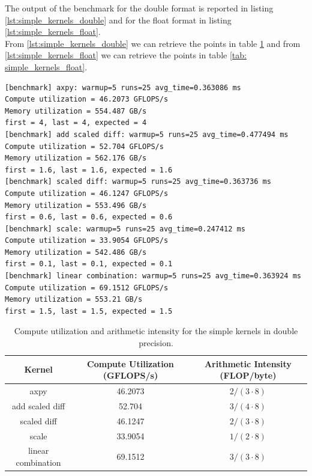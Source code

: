 \documentclass[unicode,10pt,a4paper,oneside,numbers=endperiod,openany]{scrartcl}
\begin{document}
The output of the benchmark for the double format is reported in listing \ref{lst:simple_kernels_double} and for the float format in listing \ref{lst:simple_kernels_float}.\\
From \ref{lst:simple_kernels_double} we can retrieve the points in table \ref{tab: simple_kernels_double} and from \ref{lst:simple_kernels_float} we can retrieve the points in table \ref{tab: simple_kernels_float}.



\begin{lstlisting}[style=grayverbatim,caption={Output of the simple kernels for the double format.},language=bash,label={lst:simple_kernels_double}]
[benchmark] axpy: warmup=5 runs=25 avg_time=0.363086 ms
Compute utilization = 46.2073 GFLOPS/s
Memory utilization = 554.487 GB/s
first = 4, last = 4, expected = 4
[benchmark] add scaled diff: warmup=5 runs=25 avg_time=0.477494 ms
Compute utilization = 52.704 GFLOPS/s
Memory utilization = 562.176 GB/s
first = 1.6, last = 1.6, expected = 1.6
[benchmark] scaled diff: warmup=5 runs=25 avg_time=0.363736 ms
Compute utilization = 46.1247 GFLOPS/s
Memory utilization = 553.496 GB/s
first = 0.6, last = 0.6, expected = 0.6
[benchmark] scale: warmup=5 runs=25 avg_time=0.247412 ms
Compute utilization = 33.9054 GFLOPS/s
Memory utilization = 542.486 GB/s
first = 0.1, last = 0.1, expected = 0.1
[benchmark] linear combination: warmup=5 runs=25 avg_time=0.363924 ms
Compute utilization = 69.1512 GFLOPS/s
Memory utilization = 553.21 GB/s
first = 1.5, last = 1.5, expected = 1.5
\end{lstlisting}

\begin{table}[!h]
\centering
\begin{tabular}{|c|c|c|}
\hline
Kernel & Compute Utilization (GFLOPS/s) & Arithmetic Intensity (FLOP/byte) \\
\hline
axpy & 46.2073 & $2/(3\cdot 8) $ \\
add scaled diff & 52.704 & $3/(4\cdot 8) $ \\
scaled diff & 46.1247 & $2/(3\cdot 8) $ \\
scale & 33.9054 & $1/(2\cdot 8) $ \\
linear combination & 69.1512 & $3/(3\cdot 8) $ \\
\hline
\end{tabular}
\caption{Compute utilization and arithmetic intensity for the simple kernels in double precision.}
\label{tab: simple_kernels_double}
\end{table}
\end{document}
